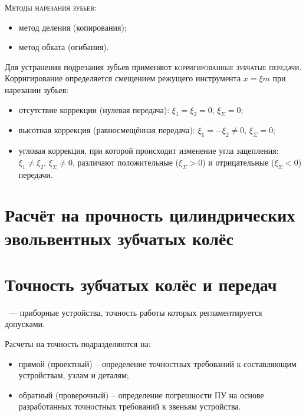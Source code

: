 \textsc{Методы нарезания зубьев}:
\begin{itemize}
	\item метод деления (копирования);
	\item метод обката (огибания).
\end{itemize}

Для устранения подрезания зубьев применяют \textsc{корригированные зубчатые передачи}.
Корригирование определяется смещением режущего инструмента $ x = \xi m $ при нарезании зубьев:
\begin{itemize}
	\item отсутствие коррекции (нулевая передача): $ \xi_1 = \xi_2 = 0, \, \xi_\Sigma=0 $;
	\item высотная коррекция (равносмещённая передача): $ \xi_1 = -\xi_2 \neq 0, \, \xi_\Sigma=0 $;
	\item угловая коррекция, при которой происходит изменение угла зацепления: $ \xi_1 \neq \xi_2, \, \xi_\Sigma \neq 0 $, различают положительные ($\xi_\Sigma > 0 $) и отрицательные ($\xi_\Sigma < 0 $) передачи.
\end{itemize}


\section{Расчёт на прочность цилиндрических эвольвентных зубчатых колёс}

\section{Точность зубчатых колёс и передач}

~--- приборные устройства, точность работы которых регламентируется допусками.

Расчеты на точность подразделяются на:
\begin{itemize}
	\item прямой (проектный) -- определение точностных требований к составляющим устройствам, узлам и деталям;
	\item обратный (проверочный) -- определение погрешности ПУ на основе разработанных точностных требований к звеньям устройства.
\end{itemize}

